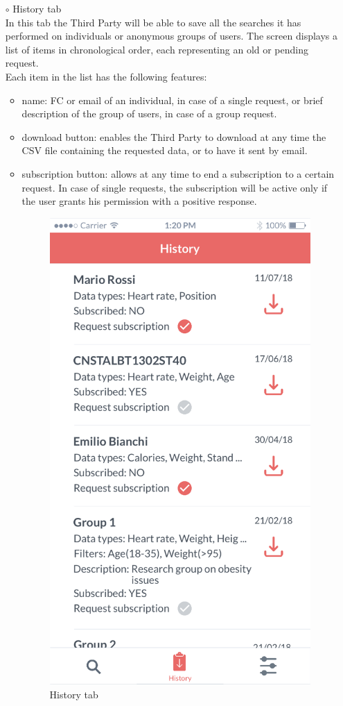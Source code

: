 \documentclass[titlepage]{article}
\begin{document}
\begin{itemize}
\begin{itemize}
\begin{itemize}
					\item[$\circ$] History tab\\
				In this tab the Third Party will be able to save all the searches it has performed on individuals or anonymous groups of users. The screen displays a list of items in chronological order, each representing an old or pending request.\\
Each item in the list has the following features:
						\begin{itemize}
							\item name: FC or email of an individual, in case of a single request, or brief description of the group of users, in case of a group request.
							\item download button: enables the Third Party to download at any time the CSV file containing the requested data, or to have it sent by email.
							\item subscription button: allows at any time to end a subscription to a certain request. In case of single requests, the subscription will be active only if the user grants his permission with a positive response.\\
					\begin{figure}[H]
						\center
  						\includegraphics[width=0.5\columnwidth]{Mockup/mockupHistory.png}
  						\caption{History tab}
 					 	\label{fig:Hist}
					\end{figure}
						\end{itemize}
						


\end{itemize}
\end{itemize}
\end{itemize}
\end{document}
